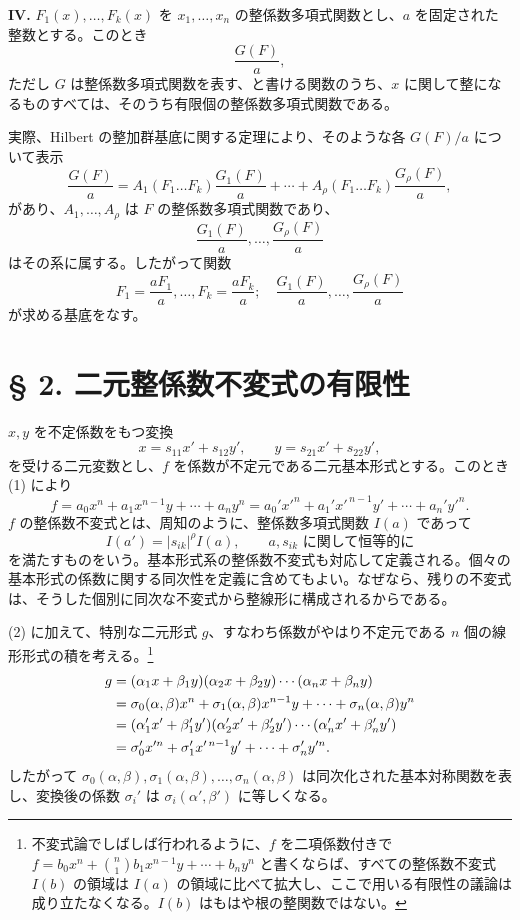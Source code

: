 \documentclass[11pt]{article}
\begin{document}
\textbf{IV.} \(F_1(x),\ldots,F_k(x)\) を \(x_1,\ldots,x_n\) の整係数多項式関数とし、\(a\) を固定された整数とする。このとき
\[
        \frac{G(F)}{a},
\]
ただし \(G\) は整係数多項式関数を表す、と書ける関数のうち、\(x\) に関して整になるものすべては、そのうち有限個の整係数多項式関数である。

実際、Hilbert の整加群基底に関する定理により、そのような各 \(G(F)/a\) について表示
\[
 \frac{G(F)}{a}
 =
 A_1(F_1\ldots F_k)\frac{G_1(F)}{a}
 +\cdots+
 A_\rho(F_1\ldots F_k)\frac{G_\rho(F)}{a},
\]
があり、\(A_1,\ldots,A_\rho\) は \(F\) の整係数多項式関数であり、
\[
        \frac{G_1(F)}{a},\ldots,\frac{G_\rho(F)}{a}
\]
はその系に属する。したがって関数
\[
        F_1=\frac{aF_1}{a},\ldots,F_k=\frac{aF_k}{a};
        \quad
        \frac{G_1(F)}{a},\ldots,\frac{G_\rho(F)}{a}
\]
が求める基底をなす。

\setcounter{equation}{0}
\section*{§ 2. 二元整係数不変式の有限性}

\(x,y\) を不定係数をもつ変換
\begin{equation}
        x=s_{11}x'+s_{12}y',\qquad y=s_{21}x'+s_{22}y',
\end{equation}
を受ける二元変数とし、\(f\) を係数が不定元である二元基本形式とする。このとき (1) により
\begin{equation}
        f=a_0x^n+a_1x^{n-1}y+\cdots+a_ny^n
        =a_0'x'^n+a_1'x'^{\,n-1}y'+\cdots+a_n'y'^n.
\end{equation}
\(f\) の整係数不変式とは、周知のように、整係数多項式関数 \(I(a)\) であって
\begin{equation}
        I(a')=|s_{ik}|^\rho I(a),\qquad \text{\(a,s_{ik}\) に関して恒等的に}
\end{equation}
を満たすものをいう。基本形式系の整係数不変式も対応して定義される。個々の基本形式の係数に関する同次性を定義に含めてもよい。なぜなら、残りの不変式は、そうした個別に同次な不変式から整線形に構成されるからである。

(2) に加えて、特別な二元形式 \(g\)、すなわち係数がやはり不定元である \(n\) 個の線形形式の積を考える。\footnote{不変式論でしばしば行われるように、\(f\) を二項係数付きで \(f=b_0x^n+\binom n1b_1x^{n-1}y+\cdots+b_ny^n\) と書くならば、すべての整係数不変式 \(I(b)\) の領域は \(I(a)\) の領域に比べて拡大し、ここで用いる有限性の議論は成り立たなくなる。\(I(b)\) はもはや根の整関数ではない。}
\begin{align}
        g&=(\alpha_1x+\beta_1y)(\alpha_2x+\beta_2y)\cdots(\alpha_nx+\beta_ny)\notag\\
         &=\sigma_0(\alpha,\beta)x^n+\sigma_1(\alpha,\beta)x^{n-1}y+\cdots+\sigma_n(\alpha,\beta)y^n\notag\\
         &=(\alpha_1'x'+\beta_1'y')(\alpha_2'x'+\beta_2'y')\cdots(\alpha_n'x'+\beta_n'y')\notag\\
         &=\sigma_0'x'^n+\sigma_1'x'^{\,n-1}y'+\cdots+\sigma_n'y'^n.
\end{align}
したがって \(\sigma_0(\alpha,\beta),\sigma_1(\alpha,\beta),\ldots,\sigma_n(\alpha,\beta)\) は同次化された基本対称関数を表し、変換後の係数 \(\sigma_i'\) は \(\sigma_i(\alpha',\beta')\) に等しくなる。
\end{document}

